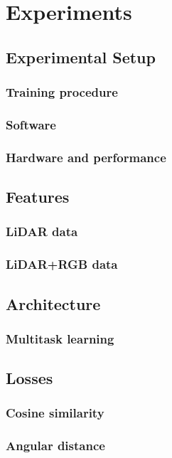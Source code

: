 \chapter{Experiments}

\section{Experimental Setup}
\subsection{Training procedure}
\subsection{Software}
\subsection{Hardware and performance}

\section{Features}
\subsection{LiDAR data}
\subsection{LiDAR+RGB data}

\section{Architecture}
\subsection{Multitask learning}

\section{Losses}
\subsection{Cosine similarity}
\subsection{Angular distance}
